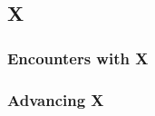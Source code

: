 \subsection{ X }

\begin{monstersingle}
\typesingle{}
\initsensessingle{}{}
\speedsingle{}
\languagessingle{}
\hpsingle{}
\acsingle{}
\savessingle{}
\vulnerabilitiessingle{}
\spacereachsingle{}{}
\stdattacksingle{}
\fullattacksingle{}
\optionssingle{}
\babedgesingle{}{}
\feintsingle{}
\attributessingle{}
\qualitiessingle{}
\featssingle{}
\skillssingle{}
\abilitysingle{}
{}
\end{monstersingle}

\subsubsection{Encounters with X }

\subsubsection{Advancing X }